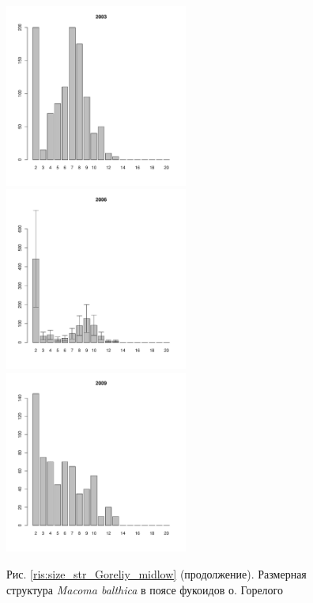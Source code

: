 \documentclass[12pt, a4paper]{article}
\begin{document}
\begin{figure}[h]
\begin{multicols}{3}
\hfill
\includegraphics[width=60mm]{../White_Sea/Luvenga_Goreliy/midlow2_2003_.pdf}
\hfill
\includegraphics[width=60mm]{../White_Sea/Luvenga_Goreliy/midlow2_2006_.pdf}
\hfill
\includegraphics[width=60mm]{../White_Sea/Luvenga_Goreliy/midlow2_2009_.pdf}
\end{multicols}



\begin{center}
Рис. \ref{ris:size_str_Goreliy_midlow} (продолжение). Размерная структура {\it Macoma balthica} в поясе фукоидов о. Горелого

\end{center}
\end{figure}
\end{document}
